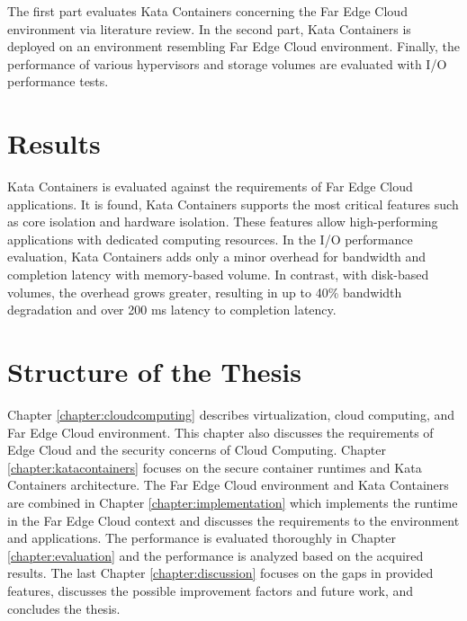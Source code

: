 The first part evaluates Kata Containers concerning the Far Edge Cloud environment via literature review. In the second part, Kata Containers is deployed on an environment resembling Far Edge Cloud environment. Finally, the performance of various hypervisors and storage volumes are evaluated with I/O performance tests.

\section{Results}
\label{section:intro_results}

Kata Containers is evaluated against the requirements of Far Edge Cloud applications. It is found, Kata Containers supports the most critical features such as core isolation and hardware isolation. These features allow high-performing applications with dedicated computing resources. In the I/O performance evaluation, Kata Containers adds only a minor overhead for bandwidth and completion latency with memory-based volume. In contrast, with disk-based volumes, the overhead grows greater, resulting in up to 40\% bandwidth degradation and over 200 ms latency to completion latency.

\section{Structure of the Thesis}
\label{section:intro_structure}

Chapter \ref{chapter:cloudcomputing} describes virtualization, cloud computing, and Far Edge Cloud environment. This chapter also discusses the requirements of Edge Cloud and the security concerns of Cloud Computing. Chapter \ref{chapter:katacontainers} focuses on the secure container runtimes and Kata Containers architecture. The Far Edge Cloud environment and Kata Containers are combined in Chapter \ref{chapter:implementation} which implements the runtime in the Far Edge Cloud context and discusses the requirements to the environment and applications. The performance is evaluated thoroughly in Chapter \ref{chapter:evaluation} and the performance is analyzed based on the acquired results. The last Chapter \ref{chapter:discussion} focuses on the gaps in provided features, discusses the possible improvement factors and future work, and concludes the thesis.